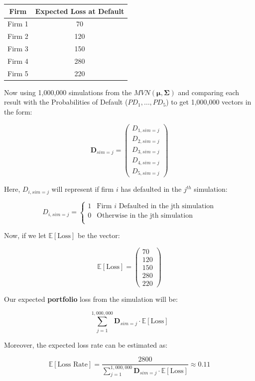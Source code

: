 \documentclass[11pt]{article}
\newcommand{\Exp}{\mathbb{E}}
\begin{document}
\begin{center}
\begin{tabular}{|c|c|}
\hline
Firm & Expected Loss at Default \\
\hline
Firm 1 & 70 \\
Firm 2 & 120 \\
Firm 3 & 150 \\
Firm 4 & 280 \\
Firm 5 & 220 \\
\hline
\end{tabular}
\end{center}

Now using 1,000,000 simulations from the $MVN(\mathbf{\mu}, 
\mathbf{\Sigma})$ and comparing each result with the Probabilities
of Default ($PD_1, \dots, PD_5$) to get 1,000,000 vectors in the form:

$$
\mathbf{D}_{sim = j} =
\begin{pmatrix}
D_{1, sim = j} \\
D_{2, sim = j} \\
D_{3, sim = j} \\
D_{4, sim = j} \\
D_{5, sim = j}
\end{pmatrix}
$$

Here, $D_{i, sim = j}$ will represent if firm $i$ has defaulted
in the $j^{th}$ simulation:

$$
D_{i, sim = j} = \begin{cases}
1 & \text{Firm } i \text{ Defaulted in the jth simulation} \\
0 & \text{Otherwise in the jth simulation} \\
\end{cases}
$$

Now, if we let $\Exp[\text{Loss}]$ be the vector:

$$
\Exp[\text{Loss}] = 
\begin{pmatrix}
70 \\
120 \\
150 \\
280 \\
220
\end{pmatrix}
$$

Our expected \textbf{portfolio} loss from the simulation will be:

$$
\sum_{j = 1}^{1,000,000}
\mathbf{D}_{sim = j} \cdot \Exp[\text{Loss}]
$$

Moreover, the expected loss rate can be estimated as:

$$
\Exp[\text{Loss Rate}] =
\frac{2800}
{\sum_{j = 1}^{1,000,000}\mathbf{D}_{sim = j} \cdot \Exp[\text{Loss}]}
\approx 0.11
$$
\end{document}
